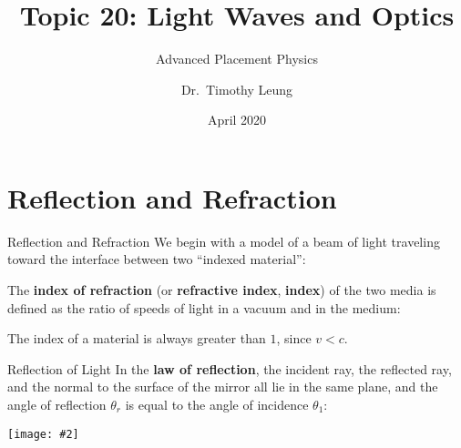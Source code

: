 \documentclass[compress,aspectratio=169]{beamer}
\title{Topic 20: Light Waves and Optics}
\subtitle{Advanced Placement Physics}
\author[TML]{Dr.\ Timothy Leung}
\institute{Olympiads School\\Toronto, Ontario, Canada}
\date{April 2020}
\newcommand{\pic}[2]{\texttt{[image: \#2]}}
\newcommand{\eq}[2]{\vspace{#1}{\LARGE\begin{displaymath}#2\end{displaymath}}}
\begin{document}
\begin{frame}
  \maketitle
\end{frame}



\section{Reflection and Refraction}

\begin{frame}{Reflection and Refraction}
  We begin with a model of a beam of light traveling toward the interface
  between two ``indexed material'':
  \begin{center}
    \vspace{-.1in}
  \end{center}
  The \textbf{index of refraction} (or \textbf{refractive index},
  \textbf{index}) of the two media is defined as the ratio of speeds of
  light in a vacuum and in the medium:

  \eq{-.2in}{
    n=\frac{c}{v}
  }

  The index of a material is always greater than $1$, since $v<c$.
\end{frame}

\begin{frame}{Reflection of Light}
  In the \textbf{law of reflection}, the incident ray, the reflected ray, and
  the normal to the surface of the mirror all lie in the same plane, and the
  angle of reflection $\theta_r$ is equal to the angle of incidence $\theta_1$:

  \eq{-.25in}{
    \boxed{\theta_r=\theta_1}
  }
  
  \begin{center}
    \vspace{-.2in}
    \pic{.7}{graphics/Types-of-reflection.png}
  \end{center}
\end{frame}
\end{document}
